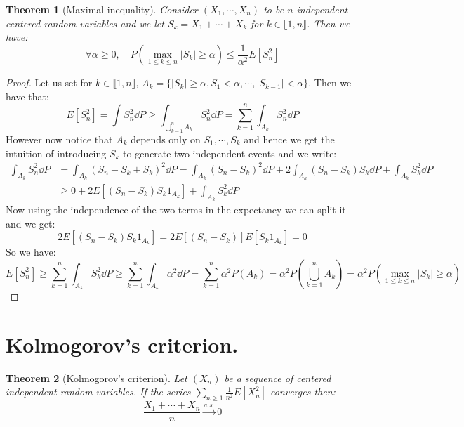 \documentclass[10pt,a4paper]{book}
\newtheorem{theorem}{Theorem}[section]
\theoremstyle{definition}
\begin{document}
\begin{theorem}[Maximal inequality]

Consider $(X_1, \cdots, X_n)$ to be $n$ independent centered random variables and we let $S_k = X_1 + \cdots + X_k$ for $k \in \llbracket 1, n \rrbracket$. Then we have:
\[
\forall \alpha \geq 0, \quad P(\max_{1 \leq k \leq n} |S_k| \geq \alpha) \leq \frac{1}{\alpha^2} E[S_n^2]
\] 

\end{theorem}

\begin{proof}

Let us set for $k \in \llbracket 1, n \rrbracket$, $A_k = \{ |S_k| \geq \alpha, S_1 < \alpha, \cdots, |S_{k-1}| < \alpha\}$. Then we have that:
\[
E[S_n^2] = \int S_n^2 \dd P \geq \int_{\bigcup_{k = 1}^n A_k} S_n^2 \dd P = \sum_{k = 1}^n \int_{A_k} S_n^2 \dd P 
\]
However now notice that $A_k$ depends only on $S_1, \cdots, S_k$ and hence we get the intuition of introducing $S_k$ to generate two independent events and we write:
\begin{align*}
\int_{A_k} S_n^2 \dd P &= \int_{A_k} (S_n - S_k + S_k)^2 \dd P = \int_{A_k} (S_n - S_k)^2 \dd P + 2 \int_{A_k} (S_n - S_k) S_k \dd P + \int_{A_k} S_k^2 \dd P\\
&\geq 0 + 2 E\left[ (S_n - S_k) S_k 1_{A_k} \right] + \int_{A_k} S_k^2 \dd P 
\end{align*}
Now using the independence of the two terms in the expectancy we can split it and we get:
\[
2 E\left[ (S_n - S_k) S_k 1_{A_k} \right] = 2 E\left[ (S_n - S_k) \right]E \left[ S_k 1_{A_k} \right] = 0 
\]
So we have:
\[
E[S_n^2] \geq \sum_{k = 1}^n \int_{A_k} S_k^2 \dd P \geq \sum_{k = 1}^n \int_{A_k} \alpha^2 \dd P = \sum_{k = 1}^n \alpha^2 P(A_k) = \alpha^2 P(\bigcup_{k = 1}^n A_k) = \alpha^2 P(\max_{1 \leq k \leq n} |S_k| \geq \alpha)
\]
\end{proof}

\section{Kolmogorov's criterion.}

\begin{theorem}[Kolmogorov's criterion]
Let $(X_n)$ be a sequence of centered independent random variables. If the series $\sum_{n \geq 1} \frac{1}{n^2} E[X_n^2]$ converges then:
\[
\frac{X_1 + \cdots + X_n}{n} \stackrel{a.s.}\longrightarrow 0
\]
\end{theorem}
\end{document}
